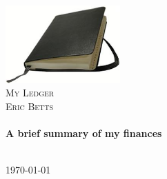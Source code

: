 \begin{titlepage}

\begin{center}


\includegraphics[width=0.33\textwidth]{./logo}\\[1cm]    

\textsc{\LARGE My Ledger}\\[1.5cm]

\textsc{\Large Eric Betts}\\[0.5cm]


\HRule \\[0.4cm]
{ \huge \bfseries A brief summary of my finances}\\[0.4cm]

\HRule \\[1.5cm]

\vfill

{\large \today }
{\large \currenttime }

\end{center}

\end{titlepage}
